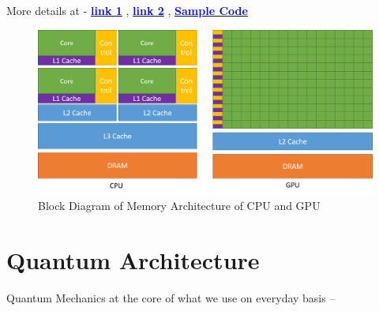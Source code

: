 \documentclass[xcolor=x11names,table]{beamer}
\begin{document}
\begin{frame}[allowframebreaks]
		\scriptsize {
			More details at -  \href{https://www.run.ai/guides/multi-gpu/cpu-vs-gpu}{\textbf{\textcolor{blue}{link 1}}} 
			,
			\href{https://www.weka.io/learn/hpc/cpu-vs-gpu}{\textbf{\textcolor{blue}{link 2}}}
			,
			\href{https://github.com/NVIDIA/cuda-samples/blob/master/Samples/0_Introduction/vectorAdd/vectorAdd.cu}{\textbf{\textcolor{blue}{Sample Code}}}
		}
		\framebreak
		\begin{figure}[p]
			\centering
			\includegraphics[width=\linewidth,height=0.8\textheight,keepaspectratio]{refs/gpu-devotes-more-transistors-to-data-processing.png}
			\caption{Block Diagram of Memory Architecture of CPU and GPU}
			\label{fig:cpu-gpu-architecture}
		\end{figure}
	\end{frame}
		
	\section{Quantum Architecture}
	
	\begin{frame}
		\centering
		Quantum Mechanics at the core of what we use on everyday basis -- \href{https://www.youtube.com/watch?v=hLtfFJ6F3rc}{\textbf{}}
	\end{frame}
\end{document}
